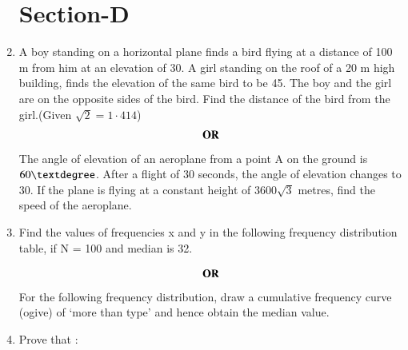 \documentclass[journal,12pt,twocolumn]{IEEEtran}
\begin{document}
\begin{enumerate}
 \section{Section-D}
 \item A boy standing on a horizontal plane finds a bird flying at a distance of 100 m from him at an elevation of 30\textdegree. A girl standing on the roof of a 20 m high building, finds the elevation of the same bird to be 45\textdegree. The boy and the girl are on the opposite sides of the bird. Find the distance of the
bird from the girl.(Given $\sqrt{2} = 1·414$)
\begin{align}
    \centering \vec{OR}\nonumber
\end{align}
The angle of elevation of an aeroplane from a point A on the ground is $60\textdegree$. After a flight of 30 seconds, the angle of elevation changes to 30\textdegree. If the plane is flying at a constant height of 3600$\sqrt{3}$ metres, find the speed of the aeroplane.\\
\bigskip
\item Find the values of frequencies x and y in the following frequency distribution table, if N = 100 and median is 32.
\begin{table} [htb]
\centering
{}
\end{table}
\begin{align}
    \centering \vec{OR}\nonumber
\end{align}
For the following frequency distribution, draw a cumulative frequency curve (ogive) of ‘more than type’ and hence obtain the median value.\\
\begin{table}[htb]
	\centering
\end{table}
\item  Prove that :

\end{enumerate}
\end{document}

